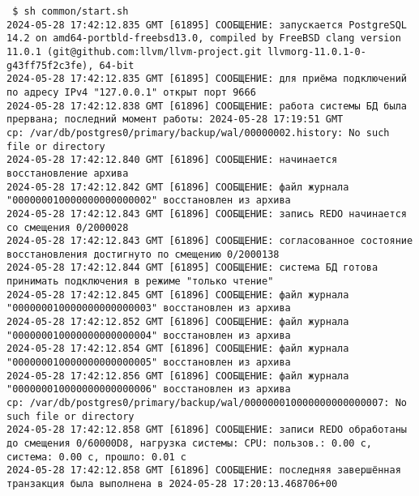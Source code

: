 \documentclass{article}
\begin{document}
\texttt{
    \$ sh common/start.sh  \\
    2024-05-28 17:42:12.835 GMT [61895] СООБЩЕНИЕ:  запускается PostgreSQL 14.2 on amd64-portbld-freebsd13.0, compiled by FreeBSD clang version 11.0.1 (git@github.com:llvm/llvm-project.git llvmorg-11.0.1-0-g43ff75f2c3fe), 64-bit\\
    2024-05-28 17:42:12.835 GMT [61895] СООБЩЕНИЕ:  для приёма подключений по адресу IPv4 "127.0.0.1" открыт порт 9666\\
    2024-05-28 17:42:12.838 GMT [61896] СООБЩЕНИЕ:  работа системы БД была прервана; последний момент работы: 2024-05-28 17:19:51 GMT\\
    cp: /var/db/postgres0/primary/backup/wal/00000002.history: No such file or directory\\
    2024-05-28 17:42:12.840 GMT [61896] СООБЩЕНИЕ:  начинается восстановление архива\\
    2024-05-28 17:42:12.842 GMT [61896] СООБЩЕНИЕ:  файл журнала "000000010000000000000002" восстановлен из архива\\
    2024-05-28 17:42:12.843 GMT [61896] СООБЩЕНИЕ:  запись REDO начинается со смещения 0/2000028\\
    2024-05-28 17:42:12.843 GMT [61896] СООБЩЕНИЕ:  согласованное состояние восстановления достигнуто по смещению 0/2000138\\
    2024-05-28 17:42:12.844 GMT [61895] СООБЩЕНИЕ:  система БД готова принимать подключения в режиме "только чтение"\\
    2024-05-28 17:42:12.845 GMT [61896] СООБЩЕНИЕ:  файл журнала "000000010000000000000003" восстановлен из архива\\
    2024-05-28 17:42:12.852 GMT [61896] СООБЩЕНИЕ:  файл журнала "000000010000000000000004" восстановлен из архива\\
    2024-05-28 17:42:12.854 GMT [61896] СООБЩЕНИЕ:  файл журнала "000000010000000000000005" восстановлен из архива\\
    2024-05-28 17:42:12.856 GMT [61896] СООБЩЕНИЕ:  файл журнала "000000010000000000000006" восстановлен из архива\\
    cp: /var/db/postgres0/primary/backup/wal/000000010000000000000007: No such file or directory\\
    2024-05-28 17:42:12.858 GMT [61896] СООБЩЕНИЕ:  записи REDO обработаны до смещения 0/60000D8, нагрузка системы: CPU: пользов.: 0.00 с, система: 0.00 с, прошло: 0.01 с\\
    2024-05-28 17:42:12.858 GMT [61896] СООБЩЕНИЕ:  последняя завершённая транзакция была выполнена в 2024-05-28 17:20:13.468706+00\\
}
\end{document}
